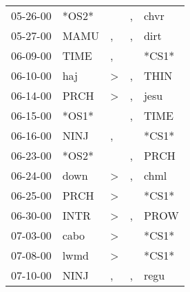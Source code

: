 \begin{supertabular}{p{0.07\textwidth}p{0.06\textwidth}p{0.02\textwidth}p{0.02\textwidth}p{0.06\textwidth}}
          05-26-00\textsuperscript{} &                            *OS2* &                  &             , &           chvr\textsuperscript{} \\
          05-27-00\textsuperscript{} &           MAMU\textsuperscript{} &                , &             , &           dirt\textsuperscript{} \\
          06-09-00\textsuperscript{} &           TIME\textsuperscript{} &                , &               &                            *CS1* \\
          06-10-00\textsuperscript{} &            haj\textsuperscript{} &     \textgreater &             , &           THIN\textsuperscript{} \\
          06-14-00\textsuperscript{} &           PRCH\textsuperscript{} &     \textgreater &             , &           jesu\textsuperscript{} \\
          06-15-00\textsuperscript{} &                            *OS1* &                  &             , &           TIME\textsuperscript{} \\
          06-16-00\textsuperscript{} &           NINJ\textsuperscript{} &                , &               &                            *CS1* \\
          06-23-00\textsuperscript{} &                            *OS2* &                  &             , &           PRCH\textsuperscript{} \\
          06-24-00\textsuperscript{} &           down\textsuperscript{} &     \textgreater &             , &           chml\textsuperscript{} \\
          06-25-00\textsuperscript{} &           PRCH\textsuperscript{} &     \textgreater &               &                            *CS1* \\
          06-30-00\textsuperscript{} &           INTR\textsuperscript{} &     \textgreater &             , &           PROW\textsuperscript{} \\
          07-03-00\textsuperscript{} &           cabo\textsuperscript{} &     \textgreater &               &                            *CS1* \\
          07-08-00\textsuperscript{} &           lwmd\textsuperscript{} &     \textgreater &               &                            *CS1* \\
          07-10-00\textsuperscript{} &           NINJ\textsuperscript{} &                , &             , &           regu\textsuperscript{} \\

\end{supertabular}
